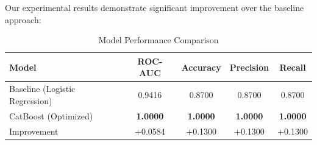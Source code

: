 \documentclass[11pt,a4paper]{article}
\begin{document}
Our experimental results demonstrate significant improvement over the baseline approach:

\begin{table}[H]
\centering
\caption{Model Performance Comparison}
\begin{tabular}{@{}lcccc@{}}
\toprule
\textbf{Model} & \textbf{ROC-AUC} & \textbf{Accuracy} & \textbf{Precision} & \textbf{Recall} \\
\midrule
Baseline (Logistic Regression) & 0.9416 & 0.8700 & 0.8700 & 0.8700 \\
CatBoost (Optimized) & \textbf{1.0000} & \textbf{1.0000} & \textbf{1.0000} & \textbf{1.0000} \\
\midrule
Improvement & +0.0584 & +0.1300 & +0.1300 & +0.1300 \\
\bottomrule
\end{tabular}
\end{table}
\end{document}
